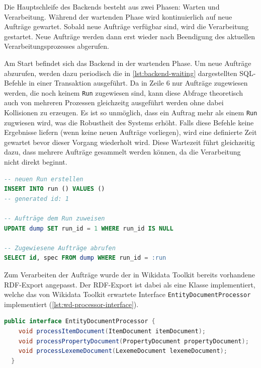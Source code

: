 Die Hauptschleife des Backends besteht aus zwei Phasen: Warten und Verarbeitung.
Während der wartenden Phase wird kontinuierlich auf neue Aufträge gewartet.
Sobald neue Aufträge verfügbar sind, wird die Verarbeitung gestartet. 
Neue Aufträge werden dann erst wieder nach Beendigung des aktuellen Verarbeitungsprozesses abgerufen.

Am Start befindet sich das Backend in der wartenden Phase.
Um neue Aufträge abzurufen, werden dazu periodisch die in \cref{lst:backend-waiting} dargestellten SQL-Befehle in einer Transaktion ausgeführt.
Da in Zeile 6 nur Aufträge zugewiesen werden, die noch keinem \verb|Run| zugewiesen sind, kann diese Abfrage theoretisch auch von mehreren Prozessen gleichzeitg ausgeführt werden ohne dabei Kollisionen zu erzeugen.
Es ist so unmöglich, dass ein Auftrag mehr als einem \verb|Run| zugwiesen wird, was die Robustheit des Systems erhöht.
Falls diese Befehle keine Ergebnisse liefern (wenn keine neuen Aufträge vorliegen), wird eine definierte Zeit gewartet bevor dieser Vorgang wiederholt wird.
Diese Wartezeit führt gleichzeitig dazu, dass mehrere Aufträge gesammelt werden können, da die Verarbeitung nicht direkt beginnt.

\begin{lstlisting}[language=SQL, caption={Abrufen neuer Aufträge}, label={lst:backend-waiting}]
-- neuen Run erstellen
INSERT INTO run () VALUES ()
-- generated id: 1

-- Aufträge dem Run zuweisen
UPDATE dump SET run_id = 1 WHERE run_id IS NULL

-- Zugewiesene Aufträge abrufen
SELECT id, spec FROM dump WHERE run_id = :run
\end{lstlisting}

Zum Verarbeiten der Aufträge wurde der in Wikidata Toolkit bereits vorhandene RDF-Export angepasst.
Der RDF-Export ist dabei als eine Klasse implementiert, welche das von Wikidata Toolkit erwartete Interface \verb|EntityDocumentProcessor| implementiert (\cref{lst:wd-processor-interface}).

\begin{lstlisting}[language=Java, caption={EntityDocumentProcessor Interface}, label={lst:wd-processor-interface}]
  public interface EntityDocumentProcessor {
    void processItemDocument(ItemDocument itemDocument);
    void processPropertyDocument(PropertyDocument propertyDocument);
    void processLexemeDocument(LexemeDocument lexemeDocument);
  }
\end{lstlisting}

